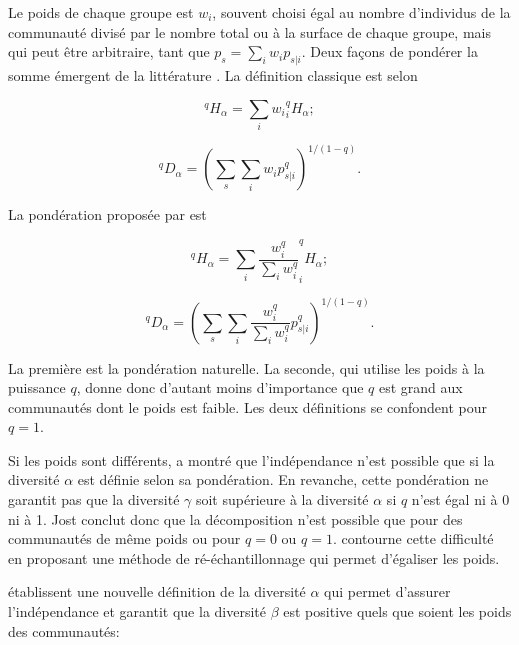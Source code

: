 \documentclass[
  11pt,
  french,
  a4paper,
  extrafontsizes,onecolumn,openright
  ]{memoir}
\begin{document}
Le poids de chaque groupe est \(w_i\), souvent choisi égal au nombre d'individus de la communauté divisé par le nombre total ou à la surface de chaque groupe, mais qui peut être arbitraire, tant que \(p_s=\sum_i{w_i p_{s|i}}\).
Deux façons de pondérer la somme émergent de la littérature \autocite{Chao2012a}.
La définition classique est selon \textcite{Routledge1979}

\begin{equation}
  \label{eq:RoutledgeHalpha}
  ^{q}\!H_{\alpha} = \sum_i{w_i {^{q}_{i}\!H_{\alpha}}};
\end{equation}

\begin{equation}
  \label{eq:RoutledgeDalpha}
  ^{q}\!D_{\alpha}={\left(\sum_s{\sum_i{w_i p^q_{s|i}}}\right)}^{1/{\left(1-q\right)}}.
\end{equation}

La pondération proposée par \textcite{Jost2007} est

\begin{equation}
  \label{eq:JostHalpha}
  ^{q}\!H_{\alpha} = \sum_i{\frac{w^q_i}{\sum_i{w^q_i}} ^{q}_{i}\!H_{\alpha}};
\end{equation}

\begin{equation}
  \label{eq:JostDalpha}
  ^{q}\!D_{\alpha} = {\left(\sum_s{\sum_i{\frac{w^q_i}{\sum_i{w^q_i}}p^q_{s|i}}}\right)}^{{1}/{\left(1-q\right)}}.
\end{equation}

La première est la pondération naturelle.
La seconde, qui utilise les poids à la puissance \(q\), donne donc d'autant moins d'importance que \(q\) est grand aux communautés dont le poids est faible.
Les deux définitions se confondent pour \(q=1\).

Si les poids sont différents, \textcite{Jost2007} a montré que l'indépendance n'est possible que si la diversité \(\alpha\) est définie selon sa pondération.
En revanche, cette pondération ne garantit pas que la diversité \(\gamma\) soit supérieure à la diversité \(\alpha\) si \(q\) n'est égal ni à 0 ni à 1.
Jost conclut donc que la décomposition n'est possible que pour des communautés de même poids ou pour \(q=0\) ou \(q=1\).
\textcite{Ricotta2009b} contourne cette difficulté en proposant une méthode de ré-échantillonnage qui permet d'égaliser les poids.

\textcite{Chiu2014} établissent une nouvelle définition de la diversité \(\alpha\) qui permet d'assurer l'indépendance et garantit que la diversité \(\beta\) est positive quels que soient les poids des communautés:
\end{document}
